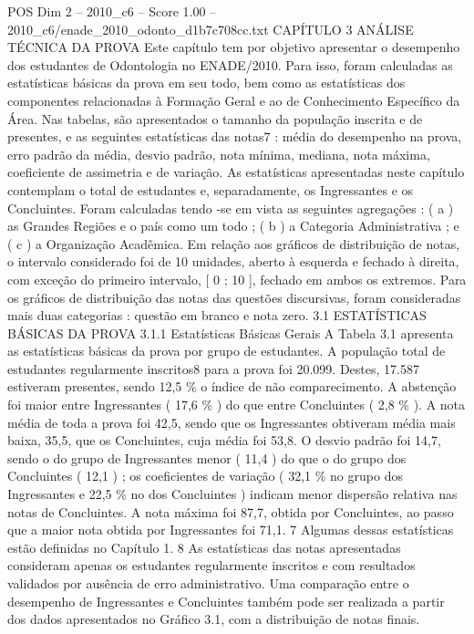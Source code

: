 \begin{textsample}{POS Dim 2 – 2010\_c6 – Score 1.00 – 2010\_c6/enade\_2010\_odonto\_d1b7c708cc.txt}  \label{ex:f2_pos_189}
CAPÍTULO 3 ANÁLISE TÉCNICA DA PROVA Este capítulo tem por objetivo apresentar o desempenho dos estudantes de Odontologia no ENADE/2010.
Para isso, foram calculadas as estatísticas básicas da prova em seu todo, bem como as estatísticas dos componentes relacionadas à Formação Geral e ao de Conhecimento Específico da Área.
Nas tabelas, são apresentados o tamanho da população inscrita e de presentes, e as seguintes estatísticas das notas7 : média do desempenho na prova, erro padrão da média, desvio padrão, nota mínima, mediana, nota máxima, coeficiente de assimetria e de variação.
As estatísticas apresentadas neste capítulo contemplam o total de estudantes e, separadamente, os Ingressantes e os Concluintes.
Foram calculadas tendo -se em vista as seguintes agregações : ( a ) as Grandes Regiões e o país como um todo ; ( b ) a Categoria Administrativa ; e ( c ) a Organização Acadêmica.
Em relação aos gráficos de distribuição de notas, o intervalo considerado foi de 10 unidades, aberto à esquerda e fechado à direita, com exceção do primeiro intervalo, [ 0 ; 10 ], fechado em ambos os extremos.
Para os gráficos de distribuição das notas das questões discursivas, foram consideradas mais duas categorias : questão em branco e nota zero. 3.1 ESTATÍSTICAS BÁSICAS DA PROVA 3.1.1 Estatísticas Básicas Gerais A Tabela 3.1 apresenta as estatísticas básicas da prova por grupo de estudantes.
A população total de estudantes regularmente inscritos8 para a prova foi 20.099.
Destes, 17.587 estiveram presentes, sendo 12,5 \% o índice de não comparecimento.
A abstenção foi maior entre Ingressantes ( 17,6 \% ) do que entre Concluintes ( 2,8 \% ).
A nota média de toda a prova foi 42,5, sendo que os Ingressantes obtiveram média mais baixa, 35,5, que os Concluintes, cuja média foi 53,8.
O desvio padrão foi 14,7, sendo o do grupo de Ingressantes menor ( 11,4 ) do que o do grupo dos Concluintes ( 12,1 ) ; os coeficientes de variação ( 32,1 \% no grupo dos Ingressantes e 22,5 \% no dos Concluintes ) indicam menor dispersão relativa nas notas de Concluintes.
A nota máxima foi 87,7, obtida por Concluintes, ao passo que a maior nota obtida por Ingressantes foi 71,1. 7 Algumas dessas estatísticas estão definidas no Capítulo 1. 8 As estatísticas das notas apresentadas consideram apenas os estudantes regularmente inscritos e com resultados validados por ausência de erro administrativo.
Uma comparação entre o desempenho de Ingressantes e Concluintes também pode ser realizada a partir dos dados apresentados no Gráfico 3.1, com a distribuição de notas finais.

\end{textsample}
